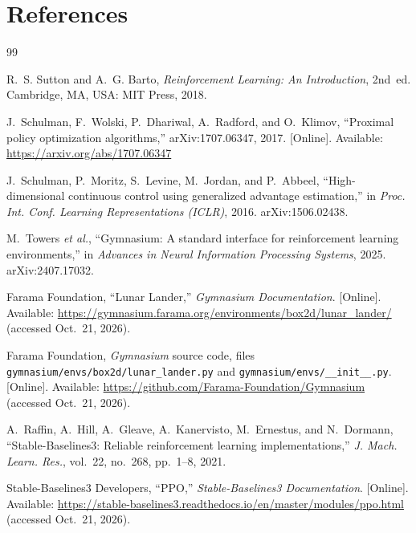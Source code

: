 \documentclass[11pt,a4paper]{article}
\begin{document}
\section*{References}\label{sec:refs}
\begingroup
\renewcommand{\section}[2]{}
\small
\begin{thebibliography}{99}
\setlength{\itemsep}{3pt}

 R.~S. Sutton and A.~G. Barto, \emph{Reinforcement Learning: An Introduction}, 2nd~ed. Cambridge, MA, USA: MIT Press, 2018.

 J.~Schulman, F.~Wolski, P.~Dhariwal, A.~Radford, and O.~Klimov, ``Proximal policy optimization algorithms,'' arXiv:1707.06347, 2017. [Online]. Available: \url{https://arxiv.org/abs/1707.06347}

 J.~Schulman, P.~Moritz, S.~Levine, M.~Jordan, and P.~Abbeel, ``High-dimensional continuous control using generalized advantage estimation,'' in \emph{Proc. Int. Conf. Learning Representations (ICLR)}, 2016. arXiv:1506.02438.

 M.~Towers \emph{et al.}, ``Gymnasium: A standard interface for reinforcement learning environments,'' in \emph{Advances in Neural Information Processing Systems}, 2025. arXiv:2407.17032.

 Farama Foundation, ``Lunar Lander,'' \emph{Gymnasium Documentation}. [Online]. Available: \url{https://gymnasium.farama.org/environments/box2d/lunar_lander/} (accessed Oct.~21, 2026).

 Farama Foundation, \emph{Gymnasium} source code, files \nolinkurl{gymnasium/envs/box2d/lunar_lander.py} and \nolinkurl{gymnasium/envs/__init__.py}. [Online]. Available: \url{https://github.com/Farama-Foundation/Gymnasium} (accessed Oct.~21, 2026).

 A.~Raffin, A.~Hill, A.~Gleave, A.~Kanervisto, M.~Ernestus, and N.~Dormann, ``Stable-Baselines3: Reliable reinforcement learning implementations,'' \emph{J. Mach. Learn. Res.}, vol.~22, no.~268, pp.~1--8, 2021.

 Stable-Baselines3 Developers, ``PPO,'' \emph{Stable-Baselines3 Documentation}. [Online]. Available: \url{https://stable-baselines3.readthedocs.io/en/master/modules/ppo.html} (accessed Oct.~21, 2026).


\end{thebibliography}
\end{document}
